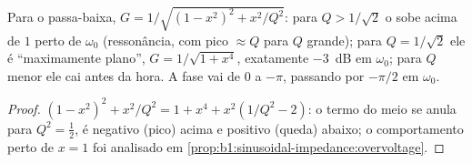 \begin{proposition}\label{prop:b1:filters-transfer-functions:lowpass2}
Para o passa-baixa, $G = 1/\sqrt{(1 - x^2)^2 + x^2/Q^2}$: para
$Q > 1/\sqrt2$ o  sobe acima de $1$ perto de $\omega_0$ (ressonância, com pico
$\approx Q$ para $Q$ grande); para $Q = 1/\sqrt2$ ele é ``maximamente plano'',
$G = 1/\sqrt{1 + x^4}$, exatamente \qty{-3}{dB} em $\omega_0$; para
$Q$ menor ele cai antes da hora. A fase vai de $0$ a $-\pi$, passando por $-\pi/2$
em $\omega_0$.
\end{proposition}

\begin{proof}
$(1 - x^2)^2 + x^2/Q^2 = 1 + x^4 + x^2(1/Q^2 - 2)$: o termo do meio
se anula para $Q^2 = \tfrac12$, é negativo (pico) acima e positivo
(queda) abaixo; o comportamento perto de $x = 1$ foi analisado em
\cref{prop:b1:sinusoidal-impedance:overvoltage}.
\end{proof}

